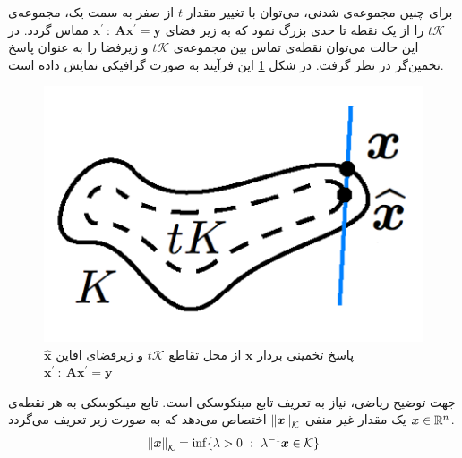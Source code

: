 برای چنین مجموعه‌ی شدنی، می‌توان با تغییر مقدار 
$t$
از صفر به سمت یک، مجموعه‌ی
$t\mathcal{K}$
را از یک نقطه تا حدی بزرگ نمود که به زیر فضای
$\bm{x}^{\prime}~:~ \bm{A}\bm{x}^{\prime}=\bm{y}$
مماس گردد. در این حالت می‌توان نقطه‌ی تماس بین مجموعه‌ی
$t\mathcal{K}$
و زیرفضا را به عنوان پاسخ تخمین‌گر در نظر گرفت. در شکل 
\ref{fig10}
این فرآیند  به صورت گرافیکی نمایش داده است.

\begin{figure}
\centering
\includegraphics[scale=0.35]{Images/ch2/fig10.png}
\caption{
$\hat{\bm{x}}$
پاسخ تخمینی بردار
$\bm{x}$
از محل تقاطع 
$t\mathcal{K}$
و 
زیرفضای افاین
$\bm{x}^{\prime}~:~ \bm{A}\bm{x}^{\prime}=\bm{y}$
\cite{Plan2016}}
\label{fig10}
\end{figure}


جهت توضیح ریاضی، نیاز به تعریف تابع مینکوسکی
است. تابع مینکوسکی
به هر نقطه‌ی
$\bm{x}\in \mathbb{R}^{n}$
یک مقدار غیر منفی 
$\left\lVert\bm{x}\right\rVert_{\mathcal{K}}$
اختصاص می‌دهد که به صورت زیر تعریف می‌گردد.
\begin{align}
\label{eq:eq18}
\left\lVert\bm{x}\right\rVert_{\mathcal{K}} = \inf \lbrace \lambda >0~:~ \lambda^{-1}\bm{x}\in \mathcal{K}\rbrace
\end{align}

